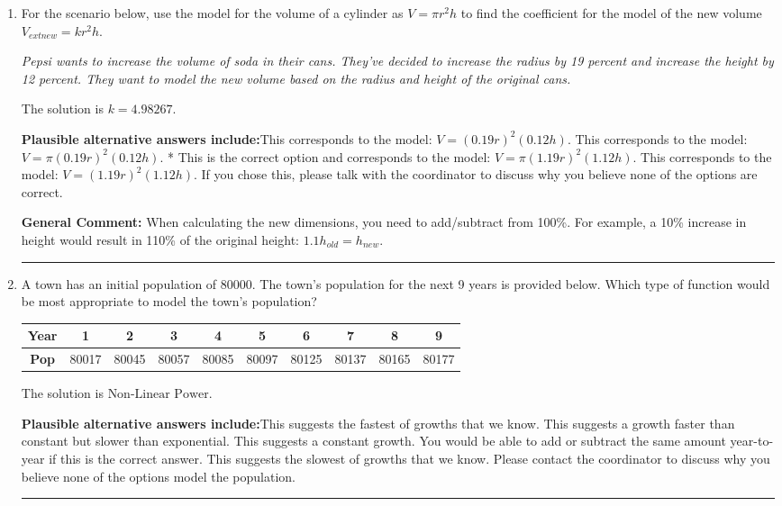 \documentclass{extbook}[14pt]
\newcommand{\litem}[1]{\item #1

\rule{\textwidth}{0.4pt}}
\begin{document}
\begin{enumerate}\litem{
For the scenario below, use the model for the volume of a cylinder as $V = \pi r^2 h$ to find the coefficient for the model of the new volume $V_{	ext{new}} = k r^2 h$.

\begin{center}
    \textit{ Pepsi wants to increase the volume of soda in their cans. They've decided to increase the radius by 19 percent and increase the height by 12 percent. They want to model the new volume based on the radius and height of the original cans. }
\end{center}
The solution is \( k = 4.98267 \).\begin{enumerate}[label=\Alph*.]
\textbf{Plausible alternative answers include:}This corresponds to the model: $V = (0.19 r)^2 (0.12 h)$.
This corresponds to the model: $V = \pi (0.19 r)^2 (0.12 h)$.
* This is the correct option and corresponds to the model: $V = \pi (1.19 r)^2 (1.12 h)$.
This corresponds to the model: $V = (1.19 r)^2 (1.12 h)$.
If you chose this, please talk with the coordinator to discuss why you believe none of the options are correct.
\end{enumerate}

\textbf{General Comment:} When calculating the new dimensions, you need to add/subtract from 100\%. For example, a 10\% increase in height would result in 110\% of the original height: $1.1h_{old} = h_{new}$.
}
\litem{
A town has an initial population of 80000. The town's population for the next 9 years is provided below. Which type of function would be most appropriate to model the town's population?


\begin{tabular}{c|c|c|c|c|c|c|c|c|c}
\textbf{Year} &1 &2 &3 &4 &5 &6 &7 &8 &9\tabularnewline \hline
\textbf{Pop} &80017 &80045 &80057 &80085 &80097 &80125 &80137 &80165 &80177\end{tabular}The solution is \( \text{Non-Linear Power} \).\begin{enumerate}[label=\Alph*.]
\textbf{Plausible alternative answers include:}This suggests the fastest of growths that we know.
This suggests a growth faster than constant but slower than exponential.
This suggests a constant growth. You would be able to add or subtract the same amount year-to-year if this is the correct answer.
This suggests the slowest of growths that we know.
Please contact the coordinator to discuss why you believe none of the options model the population.
\end{enumerate}

}
\end{enumerate}
\end{document}
